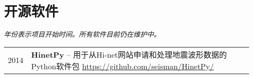 \section{开源软件}

\textit{年份表示项目开始时间。所有软件目前仍在维护中。}

\begin{tabular}{p{} p{}}
2014 & \textbf{HinetPy} -- 用于从Hi-net网站申请和处理地震波形数据的Python软件包 \newline
       \url{https://github.com/seisman/HinetPy/} \\
\end{tabular}
